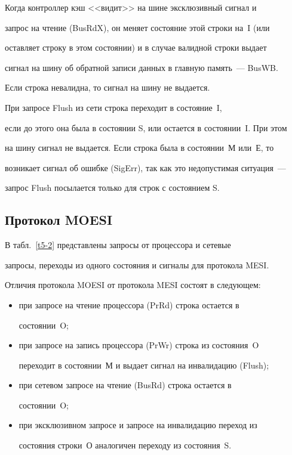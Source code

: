       Когда контроллер кэш <<видит>> на шине эксклюзивный сигнал и 


запрос на чтение (BusRdX), он меняет состояние этой строки на~I (или 


оставляет строку в этом состоянии) и  в случае валидной строки выдает 


сигнал на шину об обратной записи данных в главную память~--- BusWB. 


Если строка невалидна, то сигнал на шину не выдается. 


      


      При запросе {Flush} из сети строка переходит в состояние~I, 


если до этого она была в состоянии S, или остается в состоянии~I. При этом 


на шину сигнал не выдается. Если строка была в состоянии~М или~Е, то 


возникает сигнал об ошибке (SigErr), так как это недопустимая ситуация~--- 


запрос {Flush} посылается только для строк с состоянием S. 


      


\subsection{Протокол MOESI} %





      В табл.~\ref{t5-2} представлены запросы от процессора и сетевые 


запросы, переходы из одного состояния и сигналы для протокола MESI.











      Отличия протокола MOESI от протокола MESI состоят в следующем:


      \begin{itemize}


\item при запросе на чтение процессора (PrRd) строка остается в 


состоянии~O;


\item при запросе на запись процессора (PrWr) строка из состояния~O 


переходит в состоянии~М и выдает сигнал на инвалидацию (Flush);


\item при сетевом запросе на чтение (BusRd) строка остается в 


состоянии~O;


\item при эксклюзивном запросе и запросе на инвалидацию переход из 


состояния строки~О аналогичен переходу из состояния~S. 


\end{itemize}





